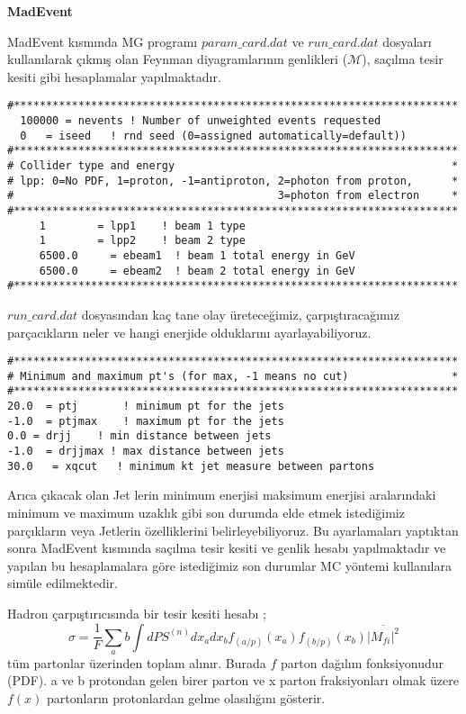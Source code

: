 \par \textbf{MadEvent} 
\par MadEvent kısmında MG programı $param\_card.dat$ ve $run\_card.dat$ dosyaları kullanılarak çıkmış olan Feynman diyagramlarının genlikleri ($\mathscr{M}$), saçılma tesir kesiti gibi hesaplamalar yapılmaktadır.


\begin{lstlisting}
#*********************************************************************
  100000 = nevents ! Number of unweighted events requested
  0   = iseed   ! rnd seed (0=assigned automatically=default))
#*********************************************************************
# Collider type and energy                                           *
# lpp: 0=No PDF, 1=proton, -1=antiproton, 2=photon from proton,      *
#                                         3=photon from electron     *
#*********************************************************************
     1        = lpp1    ! beam 1 type 
     1        = lpp2    ! beam 2 type
     6500.0     = ebeam1  ! beam 1 total energy in GeV
     6500.0     = ebeam2  ! beam 2 total energy in GeV
#*********************************************************************
\end{lstlisting}
 $run\_card.dat$ dosyasından kaç tane olay üreteceğimiz, çarpıştıracağımız parçacıkların neler ve hangi enerjide olduklarını ayarlayabiliyoruz.
\begin{lstlisting}
#*********************************************************************
# Minimum and maximum pt's (for max, -1 means no cut)                *
#*********************************************************************
20.0  = ptj       ! minimum pt for the jets 
-1.0  = ptjmax    ! maximum pt for the jets
0.0 = drjj    ! min distance between jets 
-1.0  = drjjmax ! max distance between jets
30.0   = xqcut   ! minimum kt jet measure between partons
\end{lstlisting}
Arıca çıkacak olan Jet lerin minimum enerjisi maksimum enerjisi aralarındaki minimum ve maximum uzaklık gibi son durumda elde etmek istediğimiz parçıkların veya Jetlerin özelliklerini belirleyebiliyoruz. Bu ayarlamaları yaptıktan sonra MadEvent kısmında saçılma tesir kesiti ve genlik hesabı yapılmaktadır ve yapılan bu hesaplamalara göre istediğimiz son durumlar MC yöntemi kullanılara simüle edilmektedir.
\par Hadron çarpıştırıcısında bir tesir kesiti hesabı ;
\begin{equation}
\sigma =\frac{1}{F} \sum_ab  \int dPS^{(n)} dx_a dx_b f_{(a/p)}(x_a) f_{(b/p)}(x_b) \overline{|M_{fi}|^2}
\end{equation}
tüm partonlar üzerinden toplam alınır. Burada $f$ parton dağılım fonksiyonudur (PDF). a ve b protondan gelen birer parton ve x parton fraksiyonları olmak üzere $f(x)$ partonların protonlardan gelme olasılığını gösterir.

